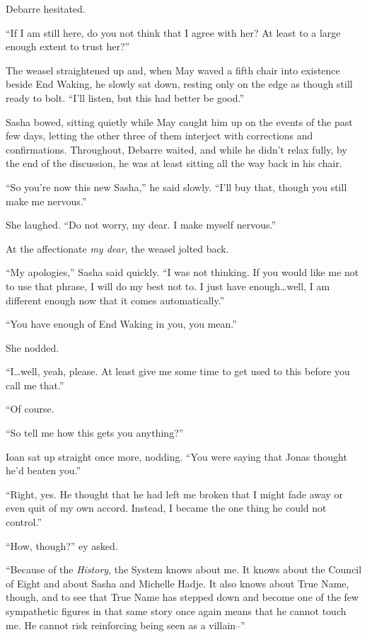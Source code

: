 Debarre hesitated.

``If I am still here, do you not think that I agree with her? At least to a large enough extent to trust her?''

The weasel straightened up and, when May waved a fifth chair into existence beside End Waking, he slowly sat down, resting only on the edge as though still ready to bolt. ``I'll listen, but this had better be good.''

Sasha bowed, sitting quietly while May caught him up on the events of the past few days, letting the other three of them interject with corrections and confirmations. Throughout, Debarre waited, and while he didn't relax fully, by the end of the discussion, he was at least sitting all the way back in his chair.

``So you're now this new Sasha,'' he said slowly. ``I'll buy that, though you still make me nervous.''

She laughed. ``Do not worry, my dear. I make myself nervous.''

At the affectionate \emph{my dear}, the weasel jolted back.

``My apologies,'' Sasha said quickly. ``I was not thinking. If you would like me not to use that phrase, I will do my best not to. I just have enough\ldots well, I am different enough now that it comes automatically.''

``You have enough of End Waking in you, you mean.''

She nodded.

``I\ldots well, yeah, please. At least give me some time to get used to this before you call me that.''

``Of course.

``So tell me how this gets you anything?''

Ioan sat up straight once more, nodding. ``You were saying that Jonas thought he'd beaten you.''

``Right, yes. He thought that he had left me broken that I might fade away or even quit of my own accord. Instead, I became the one thing he could not control.''

``How, though?'' ey asked.

``Because of the \emph{History}, the System knows about me. It knows about the Council of Eight and about Sasha and Michelle Hadje. It also knows about True Name, though, and to see that True Name has stepped down and become one of the few sympathetic figures in that same story once again means that he cannot touch me. He cannot risk reinforcing being seen as a villain--''

